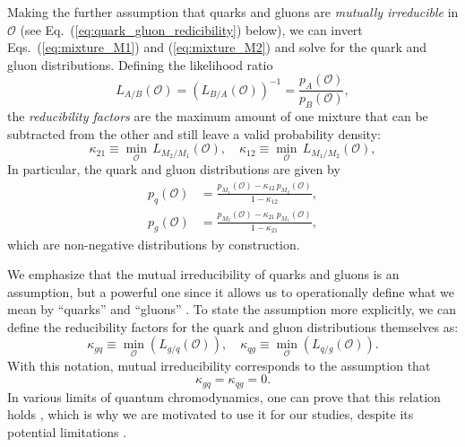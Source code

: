 \documentclass[aps,prd,twocolumn,preprintnumbers,nofootinbib,longbibliography,floatfix]{revtex4-1}
\DeclareRobustCommand{\Eq}[1]{Eq.~(\ref{#1})}
\DeclareRobustCommand{\Eqs}[2]{Eqs.~(\ref{#1}) and (\ref{#2})}
\newcommand{\figO}{\mathcal{O}}
\newcommand{\ka}{\kappa}
\begin{document}
Making the further assumption that quarks and gluons are \emph{mutually irreducible} in $\figO$ (see \Eq{eq:quark_gluon_redicibility} below), we can invert \Eqs{eq:mixture_M1}{eq:mixture_M2} and solve for the quark and gluon distributions.
%
Defining the likelihood ratio
%
\begin{equation}
\label{eq:lratio}
L_{A/B}(\figO)  = \left(L_{B/A}(\figO) \right)^{-1} = \frac{p_{A}(\figO)}{p_{B}(\figO)},
\end{equation}
%
the \emph{reducibility factors} are the maximum amount of one mixture that can be subtracted from the other and still leave a valid probability density:
%
\begin{equation}
\label{eq:kappas}
\ka_{21} \equiv \min_{\figO}\, L_{M_2/M_1}\left(\figO\right), \quad \ka_{12} \equiv \min_{\figO}\,L_{M_1/M_2}\left(\figO\right),
\end{equation}
%
In particular, the quark and gluon distributions are given by
%
\begin{align}
\label{eq:p_q}
p_q(\figO) & =\frac{p_{M_1}(\figO)-\ka_{12}\, p_{M_2}(\figO)}{1-\ka_{12}},\\
\label{eq:p_g}
p_g(\figO) &=\frac{p_{M_2}(\figO)-\ka_{21}\, p_{M_1}(\figO)}{1-\ka_{21}},
\end{align}
%
which are non-negative distributions by construction.


We emphasize that the mutual irreducibility of quarks and gluons is an assumption, but a powerful one since it allows us to operationally define what we mean by ``quarks'' and ``gluons'' \cite{Komiske:2018vkc}.
%
To state the assumption more explicitly, we can define the reducibility factors for the quark and gluon distributions themselves as:
%
\begin{equation}
\label{eq:kappasqg}
\ka_{gq} \equiv \min_{\figO} \left(L_{g/q}\left(\figO\right)\right), \quad \ka_{qg} \equiv \min_{\figO}{\left(L_{q/g}\left(\figO\right)\right)}.
\end{equation}
%
With this notation, mutual irreducibility corresponds to the assumption that
%
\begin{equation}
\label{eq:quark_gluon_redicibility}
\ka_{gq} = \ka_{qg}  = 0.
\end{equation}
%
In various limits of quantum chromodynamics, one can prove that this relation holds \cite{Metodiev:2018ftz,Larkoski:2019nwj,Stewart:2022ari}, which is why we are motivated to use it for our studies, despite its potential limitations \cite{Gras:2017jty}.
\end{document}
